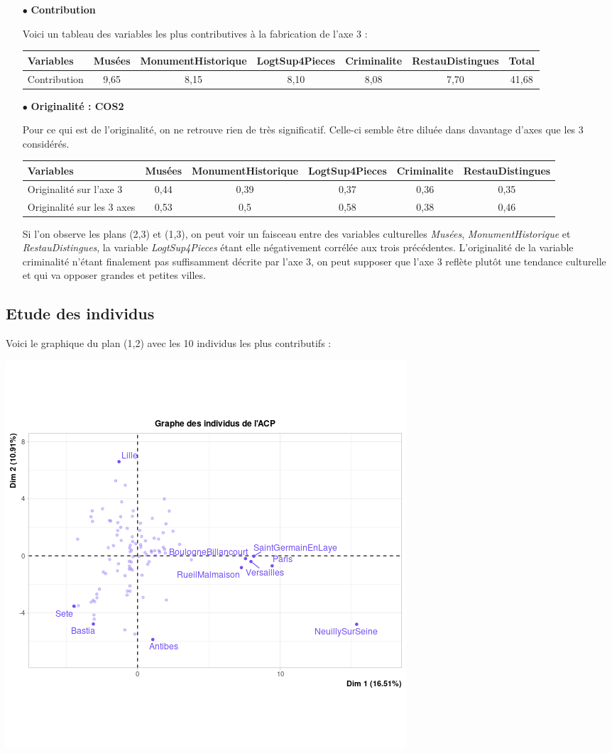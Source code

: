 \documentclass{article}
\begin{document}
\begin{itemize}
\item[$\bullet$] \textbf{Contribution}

Voici un tableau des variables les plus contributives à la fabrication de l'axe 3 : 

\begin{tabular}{|l|c|c|c|c|c|c|}
\hline 
Variables & Musées  & MonumentHistorique & LogtSup4Pieces & Criminalite & RestauDistingues & Total \\ 
\hline 
Contribution & 9,65 & 8,15 & 8,10 & 8,08 & 7,70 & 41,68 \\ 
\hline 
\end{tabular} 

\item[$\bullet$] \textbf{Originalité : COS2}

Pour ce qui est de l'originalité, on ne retrouve rien de très significatif. Celle-ci semble être diluée dans davantage d'axes que les 3 considérés. 

\begin{tabular}{|l|c|c|c|c|c|}
\hline 
Variables & Musées  & MonumentHistorique & LogtSup4Pieces & Criminalite & RestauDistingues \\ 
\hline 
Originalité sur l'axe 3 & 0,44 & 0,39 & 0,37 & 0,36 & 0,35  \\ 
\hline
Originalité sur les 3 axes & 0,53 & 0,5 & 0,58 & 0,38 & 0,46  \\ 
\hline  
\end{tabular} 

Si l'on observe les plans (2,3) et (1,3), on peut voir un faisceau entre des variables culturelles \emph{Musées}, \emph{MonumentHistorique} et \emph{RestauDistingues}, la variable \emph{LogtSup4Pieces} étant elle négativement corrélée aux trois précédentes. L'originalité de la variable criminalité n'étant finalement pas suffisamment décrite par l'axe 3, on peut supposer que l'axe 3 reflète plutôt une tendance culturelle et qui va opposer grandes et petites villes. 
\end{itemize}

\subsection{Etude des individus}

Voici le graphique du plan (1,2) avec les 10 individus les plus contributifs : 

\centerline{\includegraphics[width=0.5\linewidth]{images/ACP_ind_12_contrib}} 
\end{document}

